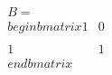 \documentclass[preview]{standalone}
\begin{document}
\begin{align*}
B = \\begin{bmatrix} 1 & 0 \\\\ 1 & 1 \\end{bmatrix}
\end{align*}
\end{document}
